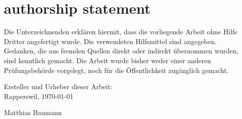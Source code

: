 
\section{authorship statement}

Die Unterzeichnenden erklären hiermit, dass die vorliegende Arbeit ohne Hilfe Dritter
angefertigt wurde. Die verwendeten Hilfsmittel sind angegeben. Gedanken, die aus
fremden Quellen direkt oder indirekt übernommen wurden, sind kenntlich gemacht. Die
Arbeit wurde bisher weder einer anderen Prüfungsbehörde vorgelegt, noch für die
Öffentlichkeit zugänglich gemacht.

\vspace{2cm}
Ersteller und Urheber dieser Arbeit:\\
Rapperswil, \today

\vspace{6cm}

Matthias Baumann